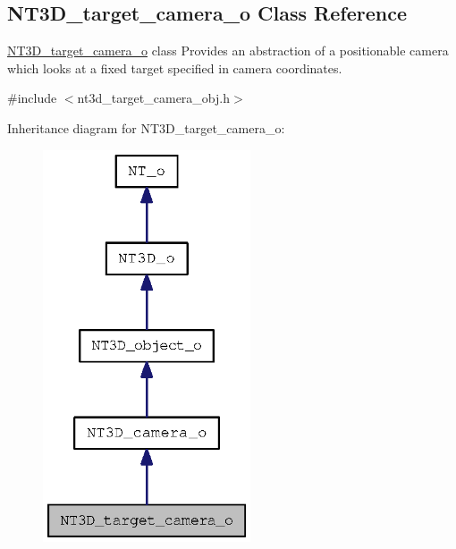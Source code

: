 \subsection{NT3D\_\-target\_\-camera\_\-o Class Reference}
\label{class_n_t3_d__target__camera__o}


\hyperlink{class_n_t3_d__target__camera__o}{NT3D\_\-target\_\-camera\_\-o} class Provides an abstraction of a positionable camera which looks at a fixed target specified in camera coordinates.  




{\ttfamily \#include $<$nt3d\_\-target\_\-camera\_\-obj.h$>$}



Inheritance diagram for NT3D\_\-target\_\-camera\_\-o:
\nopagebreak
\begin{figure}[H]
\begin{center}
\leavevmode
\includegraphics[width=174pt]{class_n_t3_d__target__camera__o__inherit__graph}
\end{center}
\end{figure}



